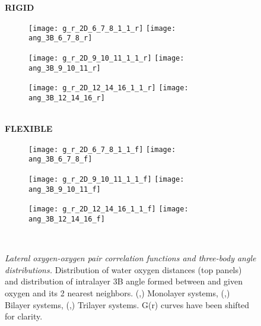 \documentclass[12pt]{article}
\begin{document}
\begin{figure}[h!]
	\centering
 	\textbf{RIGID} \\
  \begin{subfigure}[b]{0.278\textwidth}
    \texttt{[image: g\_r\_2D\_6\_7\_8\_1\_1\_r]}
    \texttt{[image: ang\_3B\_6\_7\_8\_r]}
    \caption{}
    \label{fig:gr_ang_6_7_8_r}
  \end{subfigure}
  \begin{subfigure}[b]{0.22\textwidth}
    \texttt{[image: g\_r\_2D\_9\_10\_11\_1\_1\_r]}
    \texttt{[image: ang\_3B\_9\_10\_11\_r]}
   \caption{}
    \label{fig:gr_ang_9_10_11_r}
  \end{subfigure} 
    \begin{subfigure}[b]{0.22\textwidth}
    \texttt{[image: g\_r\_2D\_12\_14\_16\_1\_1\_r]}
    \texttt{[image: ang\_3B\_12\_14\_16\_r]}
    \caption{}
    \label{fig:gr_ang_12_14_16_r}
  \end{subfigure} \\  
	\textbf{FLEXIBLE} \\
  \begin{subfigure}[b]{0.278\textwidth}
    \texttt{[image: g\_r\_2D\_6\_7\_8\_1\_1\_f]}
    \texttt{[image: ang\_3B\_6\_7\_8\_f]}
    \caption{}
    \label{fig:gr_ang_6_7_8_f}
  \end{subfigure}
  \begin{subfigure}[b]{0.22\textwidth}
    \texttt{[image: g\_r\_2D\_9\_10\_11\_1\_1\_f]}
    \texttt{[image: ang\_3B\_9\_10\_11\_f]}
   \caption{}
    \label{fig:gr_ang_9_10_11_f}
  \end{subfigure} 
    \begin{subfigure}[b]{0.22\textwidth}
    \texttt{[image: g\_r\_2D\_12\_14\_16\_1\_1\_f]}
    \texttt{[image: ang\_3B\_12\_14\_16\_f]}
    \caption{}
    \label{fig:gr_ang_12_14_16_f}
  \end{subfigure} \\  
	\caption{\textit{Lateral oxygen-oxygen pair correlation functions and three-body angle distributions.} Distribution of water oxygen distances (top panels) and distribution of intralayer 3B angle formed between and given oxygen and its 2 nearest neighbors. (\protect{},\protect{}) Monolayer systems, (\protect{},\protect{}) Bilayer systems, (\protect{},\protect{}) Trilayer systems. G(r) curves have been shifted for clarity.}
	\label{fig:gr_all}
\end{figure}
\end{document}
